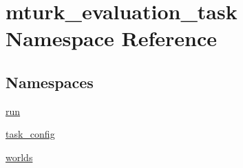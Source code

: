 \hypertarget{namespacemturk__evaluation__task}{}\section{mturk\+\_\+evaluation\+\_\+task Namespace Reference}
\label{namespacemturk__evaluation__task}
\subsection*{Namespaces}
\begin{DoxyCompactItemize}
\item 
 \hyperlink{namespacemturk__evaluation__task_1_1run}{run}
\item 
 \hyperlink{namespacemturk__evaluation__task_1_1task__config}{task\+\_\+config}
\item 
 \hyperlink{namespacemturk__evaluation__task_1_1worlds}{worlds}
\end{DoxyCompactItemize}

